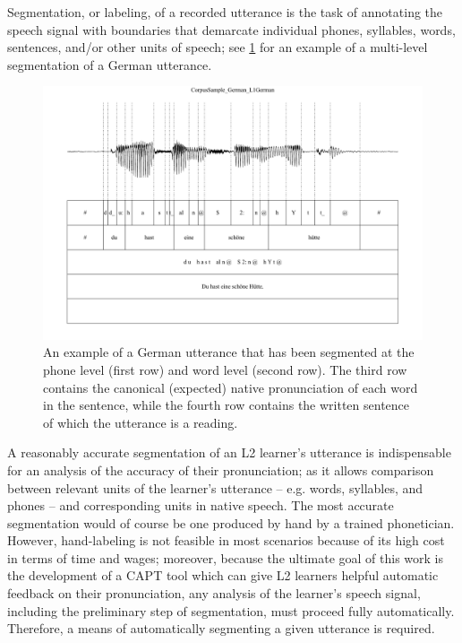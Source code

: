 
Segmentation, or labeling, of a recorded utterance is the task of annotating the speech signal with boundaries that demarcate individual phones, syllables, words, sentences, and/or other units of speech; see \cref{fig:GGsegmentation} for an example of a multi-level segmentation of a German utterance. 
	
	\begin{figure}
		\centering
		\includegraphics[width=\textwidth]{img/screenshots/SampleGG-basic}
		\caption[An example German utterance and its segmentation]{ An example of a German utterance that has been segmented at the phone level (first row) and word level (second row). The third row contains the canonical (expected) native pronunciation of each word in the sentence, while the fourth row contains the written sentence of which the utterance is a reading.}
		\label{fig:GGsegmentation}
	\end{figure}


A reasonably accurate segmentation of an L2 learner's utterance is indispensable for an analysis of the accuracy of their pronunciation; 
as it allows comparison between relevant units of the learner's utterance -- e.g. words, syllables, and phones -- and corresponding units in native speech. 
The most accurate segmentation would of course be one produced by hand by a trained phonetician. However, hand-labeling is not feasible in most scenarios because of its high cost in terms of time and wages; moreover, because the ultimate goal of this work is the development of a CAPT tool which can give L2 learners helpful automatic feedback on their pronunciation, 
any analysis of the learner's speech signal, including the preliminary step of segmentation, must proceed fully automatically. Therefore, a means of automatically segmenting a given utterance is required.



